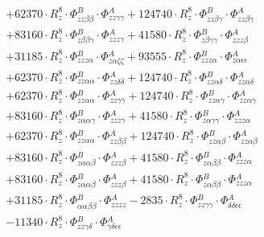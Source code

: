 \documentclass{article}
\begin{document}
\begin{subequations}
\begin{gather}
\begin{array}{c}
 \\[0.2em] 		 + 62370 \cdot R_{z}^{8} \cdot \Phi{}^{B}_{zz\beta{}\beta{}} \cdot \Phi{}^{A}_{zz\gamma{}\gamma{}}+ 124740 \cdot R_{z}^{8} \cdot \Phi{}^{B}_{zz\beta{}\gamma{}} \cdot \Phi{}^{A}_{zz\beta{}\gamma{}} 
 \\[0.2em] 		 + 83160 \cdot R_{z}^{8} \cdot \Phi{}^{B}_{z\beta{}\beta{}\gamma{}} \cdot \Phi{}^{A}_{zzz\gamma{}}+ 41580 \cdot R_{z}^{8} \cdot \Phi{}^{B}_{z\beta{}\gamma{}\gamma{}} \cdot \Phi{}^{A}_{zzz\beta{}} 
 \\[0.2em] 		 + 31185 \cdot R_{z}^{8} \cdot \Phi{}^{B}_{zzz\alpha{}} \cdot \Phi{}^{A}_{z\alpha{}\zeta{}\zeta{}}+ 93555 \cdot R_{z}^{8} \cdot \Phi{}^{B}_{zzz\alpha{}} \cdot \Phi{}^{A}_{z\alpha{}\epsilon{}\epsilon{}} 
 \\[0.2em] 		 + 62370 \cdot R_{z}^{8} \cdot \Phi{}^{B}_{zz\alpha{}\alpha{}} \cdot \Phi{}^{A}_{zz\delta{}\delta{}}+ 124740 \cdot R_{z}^{8} \cdot \Phi{}^{B}_{zz\alpha{}\delta{}} \cdot \Phi{}^{A}_{zz\alpha{}\delta{}} 
 \\[0.2em] 		 + 62370 \cdot R_{z}^{8} \cdot \Phi{}^{B}_{zz\alpha{}\alpha{}} \cdot \Phi{}^{A}_{zz\gamma{}\gamma{}}+ 124740 \cdot R_{z}^{8} \cdot \Phi{}^{B}_{zz\alpha{}\gamma{}} \cdot \Phi{}^{A}_{zz\alpha{}\gamma{}} 
 \\[0.2em] 		 + 83160 \cdot R_{z}^{8} \cdot \Phi{}^{B}_{z\alpha{}\alpha{}\gamma{}} \cdot \Phi{}^{A}_{zzz\gamma{}}+ 41580 \cdot R_{z}^{8} \cdot \Phi{}^{B}_{z\alpha{}\gamma{}\gamma{}} \cdot \Phi{}^{A}_{zzz\alpha{}} 
 \\[0.2em] 		 + 62370 \cdot R_{z}^{8} \cdot \Phi{}^{B}_{zz\alpha{}\alpha{}} \cdot \Phi{}^{A}_{zz\beta{}\beta{}}+ 124740 \cdot R_{z}^{8} \cdot \Phi{}^{B}_{zz\alpha{}\beta{}} \cdot \Phi{}^{A}_{zz\alpha{}\beta{}} 
 \\[0.2em] 		 + 83160 \cdot R_{z}^{8} \cdot \Phi{}^{B}_{z\alpha{}\alpha{}\beta{}} \cdot \Phi{}^{A}_{zzz\beta{}}+ 41580 \cdot R_{z}^{8} \cdot \Phi{}^{B}_{z\alpha{}\beta{}\beta{}} \cdot \Phi{}^{A}_{zzz\alpha{}} 
 \\[0.2em] 		 + 83160 \cdot R_{z}^{8} \cdot \Phi{}^{B}_{z\alpha{}\alpha{}\beta{}} \cdot \Phi{}^{A}_{zzz\beta{}}+ 41580 \cdot R_{z}^{8} \cdot \Phi{}^{B}_{z\alpha{}\beta{}\beta{}} \cdot \Phi{}^{A}_{zzz\alpha{}} 
 \\[0.2em] 		 + 31185 \cdot R_{z}^{8} \cdot \Phi{}^{B}_{\alpha{}\alpha{}\beta{}\beta{}} \cdot \Phi{}^{A}_{zzzz}- 2835 \cdot R_{z}^{8} \cdot \Phi{}^{B}_{zz\gamma{}\gamma{}} \cdot \Phi{}^{A}_{\delta{}\delta{}\epsilon{}\epsilon{}} 
 \\[0.2em] 		 - 11340 \cdot R_{z}^{8} \cdot \Phi{}^{B}_{zz\gamma{}\delta{}} \cdot \Phi{}^{A}_{\gamma{}\delta{}\epsilon{}\epsilon{}} 

\end{array}
\end{gather}
\end{subequations}
\end{document}
